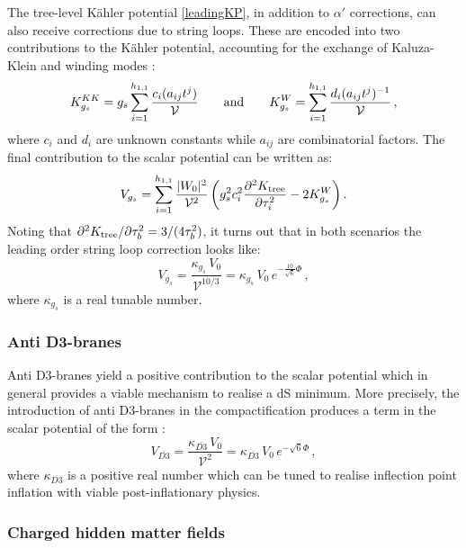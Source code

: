 \documentclass[11pt,a4paper]{article}
\newcommand{\be}{\begin{equation}}
\newcommand{\ee}{\end{equation}}
\newcommand\vo{{\mathcal{V}}}
\newcommand{\V}{{\cal{V}}}
\begin{document}
The tree-level K\"ahler potential \eqref{leadingKP}, in addition to $\alpha'$ corrections, can also receive corrections due to string loops. 
These are encoded into two contributions to the K\"ahler potential, accounting for the exchange of Kaluza-Klein and winding modes \cite{loops}:
\be
K^{KK}_{g_s} = g_s \sum_{i = 1}^{h_{1,1}} \frac{c_i (a_{ij} t^j)}{\V} \qquad\text{and}\qquad K^W_{g_s} = \sum_{i = 1}^{h_{1,1}} \frac{d_i (a_{ij} t^j)^{-1}}{\V}\,,
\ee
where $c_i$ and $d_i$ are unknown constants while $a_{ij}$ are combinatorial factors. The final contribution to the scalar potential can be written as:
\be
V_{g_s} = \sum_{i = 1}^{h_{1,1}} \frac{|W_0|^2}{\vo^2} \left(g_s^2 c_i^2 \frac{\partial^2 K_{\rm tree}}{\partial \tau_i^2} - 2 K^W_{g_s}\right).
\label{slccontributiontov}
\ee
Noting that $\partial^2 K_{\rm tree}/\partial\tau_b^2 = 3/(4 \tau_b^2)$, it turns out that in both scenarios the leading order string loop correction looks like:
\be
V_{g_s} = \frac{\kappa_{g_s}\,V_0}{\vo^{10/3}} = \kappa_{g_s}\,V_0\,e^{-\frac{10}{\sqrt{6}} \Phi}\,,
\label{Vgs}
\ee
where $\kappa_{g_s}$ is a real tunable number.

\subsubsection{Anti D3-branes}

Anti D3-branes yield a positive contribution to the scalar potential which in general provides a viable mechanism to realise a dS minimum. More precisely, the introduction of anti D3-branes in the compactification produces a term in the scalar potential of the form \cite{Kachru:2003aw}:
\be
V_{\overline{D3}} = \frac{\kappa_{\overline{D3}}\,V_0}{\vo^2} = \kappa_{\overline{D3}}\,V_0\,e^{-\sqrt{6}\Phi}\,,
\label{VD3}
\ee
where $\kappa_{\overline{D3}}$ is a positive real number which can be tuned to realise inflection point inflation with viable post-inflationary physics. 

\subsubsection{Charged hidden matter fields}
\end{document}
